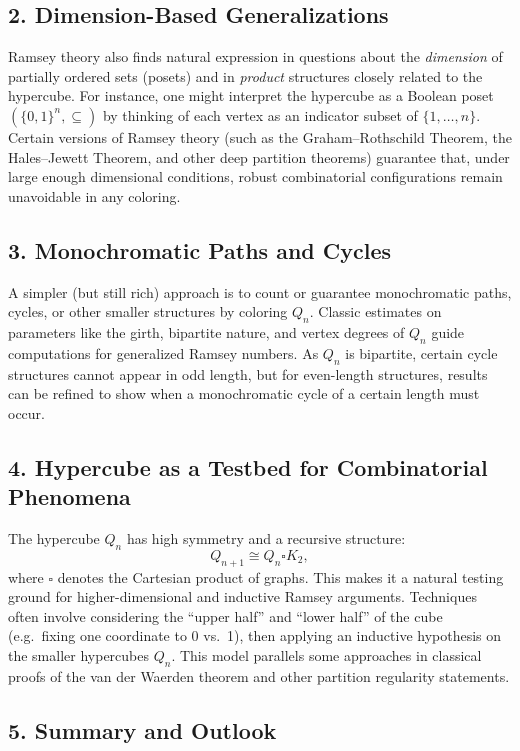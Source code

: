 \documentclass[12p]{article}
\newcounter{answercounter}
\newenvironment{answer}[1][]
{\refstepcounter{answercounter}%
\begin{tcolorbox}[
    title=Answer \theanswercounter: #1,
    colback=white, %
    colframe=gray,
    coltext=black, %
    fonttitle=\bfseries\normalsize,
    top=2mm,
    bottom=2mm,
    enlarge top initially by=5mm
]
\small
}
{\end{tcolorbox}}
\begin{document}
\begin{answer}[by openai/o1 (generated in 0 minutes and 21 seconds.)]
\subsection*{2. Dimension-Based Generalizations}

Ramsey theory also finds natural expression in questions about the \emph{dimension} of partially ordered sets (posets) and in \emph{product} structures closely related to the hypercube. For instance, one might interpret the hypercube as a Boolean poset \((\{0,1\}^n, \subseteq)\) by thinking of each vertex as an indicator subset of \(\{1,\dots,n\}\). Certain versions of Ramsey theory (such as the Graham–Rothschild Theorem, the Hales–Jewett Theorem, and other deep partition theorems) guarantee that, under large enough dimensional conditions, robust combinatorial configurations remain unavoidable in any coloring.

\subsection*{3. Monochromatic Paths and Cycles}

A simpler (but still rich) approach is to count or guarantee monochromatic paths, cycles, or other smaller structures by coloring \(Q_n\). Classic estimates on parameters like the girth, bipartite nature, and vertex degrees of \(Q_n\) guide computations for generalized Ramsey numbers. As \(Q_n\) is bipartite, certain cycle structures cannot appear in odd length, but for even-length structures, results can be refined to show when a monochromatic cycle of a certain length must occur.

\subsection*{4. Hypercube as a Testbed for Combinatorial Phenomena}

The hypercube \(Q_n\) has high symmetry and a recursive structure: 
\[
Q_{n+1} \cong Q_n \square K_2,
\]
where \(\square\) denotes the Cartesian product of graphs. This makes it a natural testing ground for higher-dimensional and inductive Ramsey arguments. Techniques often involve considering the “upper half” and “lower half” of the cube (e.g.\ fixing one coordinate to 0 vs.\ 1), then applying an inductive hypothesis on the smaller hypercubes \(Q_n\). This model parallels some approaches in classical proofs of the van der Waerden theorem and other partition regularity statements.

\subsection*{5. Summary and Outlook}


\end{answer}
\end{document}
